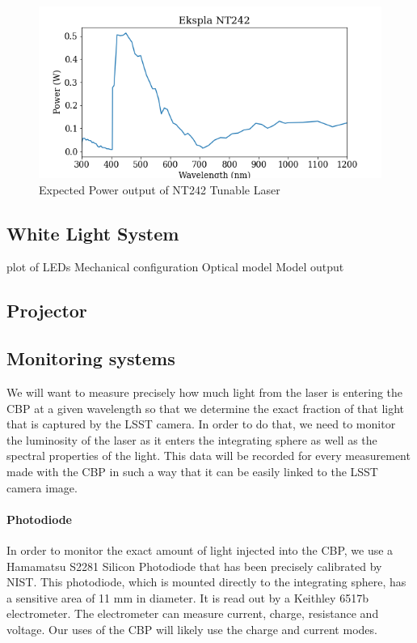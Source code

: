 \documentclass[SE,authoryear,toc]{article}
\begin{document}
\begin{table}[|||]
\begin{figure}[h]
    \centering
    \includegraphics[width=\textwidth]{nt242_output.png}
    \caption{Expected Power output of NT242 Tunable Laser}
    \label{fig:laser_power}
\end{figure}


\subsection{White Light System}
plot of LEDs
Mechanical configuration
Optical model
Model output

\subsection{Projector}

\subsection{Monitoring systems}

We will want to measure precisely how much light from the laser is entering the CBP at a given wavelength so that we determine the exact fraction of that light that is captured by the LSST camera. In order to do that, we need to monitor the luminosity of the laser as it enters the integrating sphere as well as the spectral properties of the light. This data will be recorded for every measurement made with the CBP in such a way that it can be easily linked to the LSST camera image. 

\paragraph{\textbf{Photodiode}}

In order to monitor the exact amount of light injected into the CBP, we use a Hamamatsu S2281 Silicon Photodiode that has been precisely calibrated by NIST. 
This photodiode, which is mounted directly to the integrating sphere, has a sensitive area of 11 mm in diameter. It is read out by a Keithley 6517b electrometer. The electrometer can measure current, charge, resistance and voltage. Our uses of the CBP will likely use the charge and current modes. 


\end{table}
\end{document}

